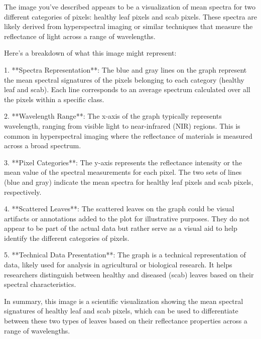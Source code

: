 The image you've described appears to be a visualization of mean spectra for two different categories of pixels: healthy leaf pixels and scab pixels. These spectra are likely derived from hyperspectral imaging or similar techniques that measure the reflectance of light across a range of wavelengths.

Here's a breakdown of what this image might represent:

1. **Spectra Representation**: The blue and gray lines on the graph represent the mean spectral signatures of the pixels belonging to each category (healthy leaf and scab). Each line corresponds to an average spectrum calculated over all the pixels within a specific class.

2. **Wavelength Range**: The x-axis of the graph typically represents wavelength, ranging from visible light to near-infrared (NIR) regions. This is common in hyperspectral imaging where the reflectance of materials is measured across a broad spectrum.

3. **Pixel Categories**: The y-axis represents the reflectance intensity or the mean value of the spectral measurements for each pixel. The two sets of lines (blue and gray) indicate the mean spectra for healthy leaf pixels and scab pixels, respectively.

4. **Scattered Leaves**: The scattered leaves on the graph could be visual artifacts or annotations added to the plot for illustrative purposes. They do not appear to be part of the actual data but rather serve as a visual aid to help identify the different categories of pixels.

5. **Technical Data Presentation**: The graph is a technical representation of data, likely used for analysis in agricultural or biological research. It helps researchers distinguish between healthy and diseased (scab) leaves based on their spectral characteristics.

In summary, this image is a scientific visualization showing the mean spectral signatures of healthy leaf and scab pixels, which can be used to differentiate between these two types of leaves based on their reflectance properties across a range of wavelengths.